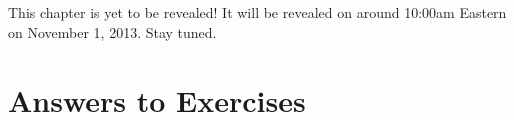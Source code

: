 \documentclass[justified]{tufte-book}
\begin{document}
This chapter is yet to be revealed!  It will be revealed on
around 10:00am Eastern on November 1, 2013.  Stay tuned.


%

%

%

%
%

\finalizeanswers
\chapter*{Answers to Exercises}
\small
{}
\normalsize
\backmatter

\printindex
\end{document}
